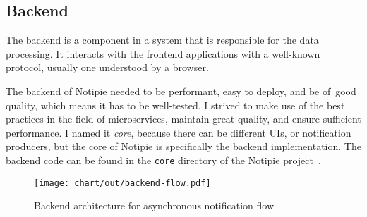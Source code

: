 \subsection{Backend}\label{sec:backend}

The backend is a component in a system
that is responsible for the data processing.
It interacts with the frontend applications
with a well-known protocol,
usually one understood by a browser.

The backend of Notipie
needed to be performant,
easy to deploy,
and be of~good quality,
which means it has to be well-tested.
I strived to make use of the best practices
in the field of microservices,
maintain great quality,
and ensure sufficient performance.
I named it \textit{core},
because there can be different \acp{UI},
or notification producers,
but the core of Notipie
is specifically the backend implementation.
The backend code can be found in the
\texttt{core} directory of the Notipie project~\cite{sewera_notipie_2022}.

\begin{figure}[!ht]
  \centering
  \texttt{[image: chart/out/backend-flow.pdf]}
  \caption{Backend architecture for asynchronous notification flow}
  \label{fig:high-level-backend-flow}
\end{figure}




